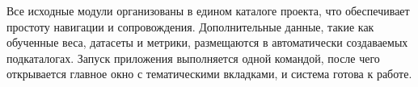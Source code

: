 Все исходные модули организованы в едином каталоге проекта, что обеспечивает простоту навигации и сопровождения. Дополнительные данные, такие как обученные веса, датасеты и метрики, размещаются в автоматически создаваемых подкаталогах. Запуск приложения выполняется одной командой, после чего открывается главное окно с тематическими вкладками, и система готова к работе.

